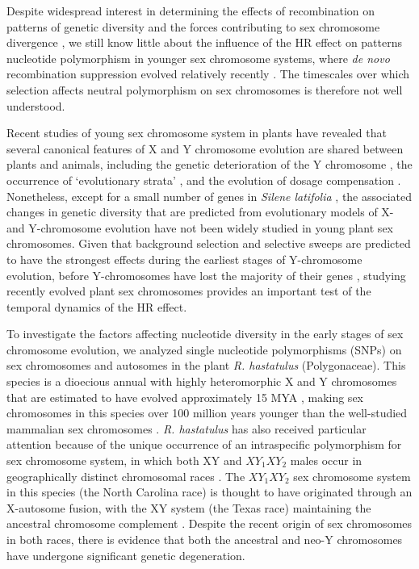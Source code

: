 \documentclass[9pt,twocolumn,twoside]{gsajnl}
\begin{document}
Despite widespread interest in determining the effects of recombination on patterns of genetic diversity and the forces contributing to sex chromosome divergence \citep{ellegren2011,otto2011PAR,bachtrog2013NRG}, we still know little about the influence of the HR effect on patterns nucleotide polymorphism in younger sex chromosome systems, where \textit{de novo} recombination suppression evolved relatively recently \citep{charlesworth2016plant}. The timescales over which selection affects neutral polymorphism on sex chromosomes is therefore not well understood. 

Recent studies of young sex chromosome system in plants have revealed that several canonical features of X and Y chromosome evolution are shared between plants and animals, including the genetic deterioration of the Y chromosome \citep{bergero2015,hough2014}, the occurrence of ‘evolutionary strata’ \citep{bergero2009}, and the evolution of dosage compensation \citep{muyle2012,papadopulos2015}. Nonetheless, except for a small number of genes in \textit{Silene latifolia} \citep{filatov2001diversity,qiu2010nucleotide}, the associated changes in genetic diversity that are predicted from evolutionary models of X- and Y-chromosome evolution have not been widely studied in young plant sex chromosomes. Given that background selection and selective sweeps are predicted to have the strongest effects during the earliest stages of Y-chromosome evolution, before Y-chromosomes have lost the majority of their genes \citep{bachtrog2008temporal}, studying recently evolved plant sex chromosomes provides an important test of the temporal dynamics of the HR effect.

To investigate the factors affecting nucleotide diversity in the early stages of sex chromosome evolution, we analyzed single nucleotide polymorphisms (SNPs) on sex chromosomes and autosomes in the plant \textit{R. hastatulus }(Polygonaceae). This species is a dioecious annual with highly heteromorphic X and Y chromosomes that are estimated to have evolved  approximately 15 MYA \citep{quesada2011,grabowska2015,navajas2005}, making sex chromosomes in this species over 100 million years younger than the well-studied mammalian sex chromosomes \citep{lahn1999,ross2005dna}. \textit{R. hastatulus} has also received particular attention because of the unique occurrence of an intraspecific polymorphism for sex chromosome system, in which both XY and $XY_{1}XY_{2}$ males occur in geographically distinct chromosomal races \citep{smith1963mechanism}. The $XY_{1}XY_{2}$ sex chromosome system in this species (the North Carolina race) is thought to have originated through an X-autosome fusion, with the XY system (the Texas race) maintaining the ancestral chromosome complement \citep{smith1964evolving}. Despite the recent origin of sex chromosomes in both races, there is evidence that both the ancestral and neo-Y chromosomes have undergone significant genetic degeneration\citep{hough2014}.
\end{document}
